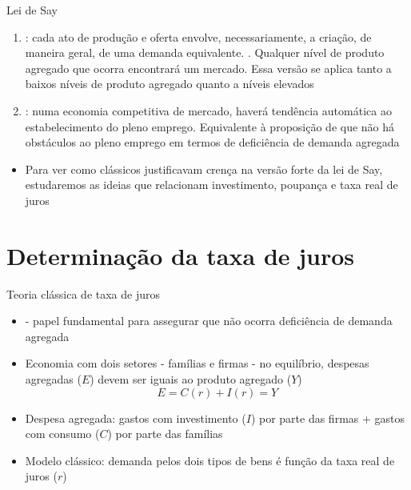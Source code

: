 \documentclass[10pt]{beamer}
\begin{document}
\begin{frame}
    {Lei de Say}
    \begin{enumerate}
        \item {}: cada ato de produção e oferta envolve, necessariamente, a criação, de maneira geral, de uma demanda equivalente. . Qualquer nível de produto agregado que ocorra encontrará um mercado. Essa versão se aplica tanto a baixos níveis de produto agregado quanto a níveis elevados\bigskip        
        \item {}: numa economia competitiva de mercado, haverá tendência automática ao estabelecimento do pleno emprego. Equivalente à proposição de que não há obstáculos ao pleno emprego em termos de deficiência de demanda agregada\bigskip
    \end{enumerate}
    \begin{itemize}
        \item Para ver como clássicos justificavam crença na versão forte da lei de Say, estudaremos as ideias que relacionam investimento, poupança e taxa real de juros
    \end{itemize}
\end{frame}

\section{Determinação da taxa de juros}
\begin{frame}
    {Teoria clássica de taxa de juros}
    \begin{itemize}
        \item {} - papel fundamental para assegurar que não ocorra deficiência de demanda agregada\bigskip
        \item Economia com dois setores - famílias e firmas - no equilíbrio, despesas agregadas ($E$) devem ser iguais ao produto agregado ($Y$)
        \begin{equation}
            E = C(r) + I(r) = Y
            \label{aula3_eq1}
        \end{equation}
        \item Despesa agregada: gastos com investimento ($I$) por parte das firmas + gastos com consumo ($C$) por parte das famílias\bigskip
        \item Modelo clássico: demanda pelos dois tipos de bens é função da taxa real de juros ($r$)
    \end{itemize}
\end{frame}
\end{document}
